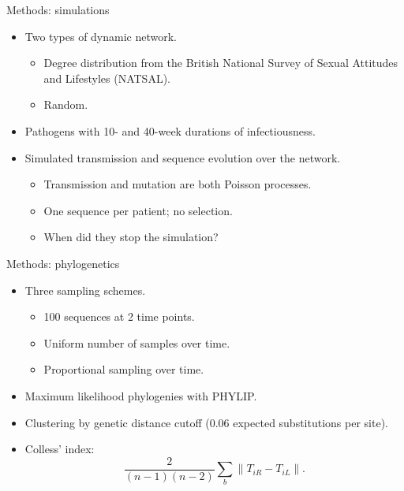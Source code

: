 \documentclass{beamer}
\begin{document}
\begin{frame}{Methods: simulations}
    \begin{itemize}
        \item Two types of dynamic network.
            \begin{itemize}
                \item Degree distribution from the British National Survey of
                    Sexual Attitudes and Lifestyles (NATSAL).
                \item Random.
            \end{itemize}
        \item Pathogens with 10- and 40-week durations of infectiousness.
        \item Simulated transmission and sequence evolution over the network.
            \begin{itemize}
                \item Transmission and mutation are both Poisson processes.
                \item One sequence per patient; no selection.
                \item When did they stop the simulation?
            \end{itemize}
    \end{itemize}
\end{frame}

\begin{frame}{Methods: phylogenetics}
    \begin{itemize}
        \item Three sampling schemes.
            \begin{itemize}
                \item 100 sequences at 2 time points.
                \item Uniform number of samples over time.
                \item Proportional sampling over time.
            \end{itemize}
        \item Maximum likelihood phylogenies with PHYLIP.
        \item Clustering by genetic distance cutoff (0.06 expected
            substitutions per site).
        \item Colless' index:
            \[
                \frac{2}{(n-1)(n-2)} \sum_b \lVert T_{iR} - T_{iL} \rVert.
            \]
    \end{itemize}
\end{frame}
\end{document}
